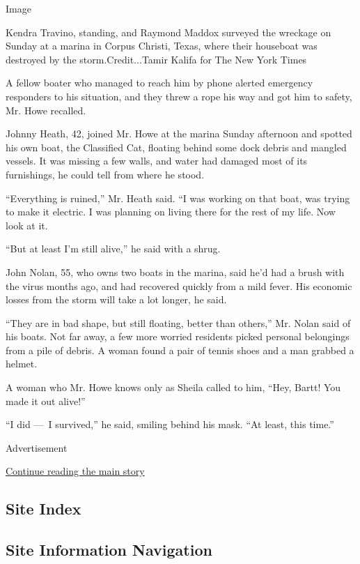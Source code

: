 Image

Kendra Travino, standing, and Raymond Maddox surveyed the wreckage on
Sunday at a marina in Corpus Christi, Texas, where their houseboat was
destroyed by the storm.Credit...Tamir Kalifa for The New York Times

A fellow boater who managed to reach him by phone alerted emergency
responders to his situation, and they threw a rope his way and got him
to safety, Mr. Howe recalled.

Johnny Heath, 42, joined Mr. Howe at the marina Sunday afternoon and
spotted his own boat, the Classified Cat, floating behind some dock
debris and mangled vessels. It was missing a few walls, and water had
damaged most of its furnishings, he could tell from where he stood.

``Everything is ruined,'' Mr. Heath said. ``I was working on that boat,
was trying to make it electric. I was planning on living there for the
rest of my life. Now look at it.

``But at least I'm still alive,'' he said with a shrug.

John Nolan, 55, who owns two boats in the marina, said he'd had a brush
with the virus months ago, and had recovered quickly from a mild fever.
His economic losses from the storm will take a lot longer, he said.

``They are in bad shape, but still floating, better than others,'' Mr.
Nolan said of his boats. Not far away, a few more worried residents
picked personal belongings from a pile of debris. A woman found a pair
of tennis shoes and a man grabbed a helmet.

A woman who Mr. Howe knows only as Sheila called to him, ``Hey, Bartt!
You made it out alive!''

``I did ---~I survived,'' he said, smiling behind his mask. ``At least,
this time.''

Advertisement

\protect\hyperlink{after-bottom}{Continue reading the main story}

\hypertarget{site-index}{%
\subsection{Site Index}\label{site-index}}

\hypertarget{site-information-navigation}{%
\subsection{Site Information
Navigation}\label{site-information-navigation}}

